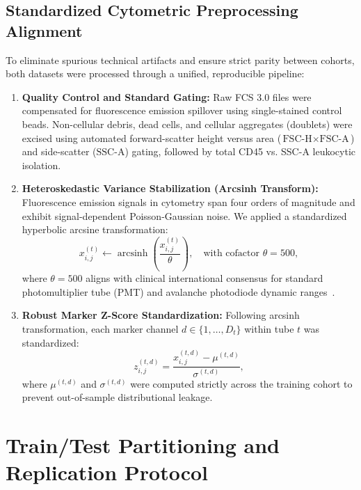 \documentclass[10pt,journal,compsoc]{IEEEtran}
\begin{document}
\subsection{Standardized Cytometric Preprocessing Alignment}
To eliminate spurious technical artifacts and ensure strict parity between cohorts, both datasets were processed through a unified, reproducible pipeline:
\begin{enumerate}
    \item \textbf{Quality Control and Standard Gating:} Raw FCS 3.0 files were compensated for fluorescence emission spillover using single-stained control beads. Non-cellular debris, dead cells, and cellular aggregates (doublets) were excised using automated forward-scatter height versus area ($\text{FSC-H} \times \text{FSC-A}$) and side-scatter ($\text{SSC-A}$) gating, followed by total CD45 vs. SSC-A leukocytic isolation.
    \item \textbf{Heteroskedastic Variance Stabilization (Arcsinh Transform):} Fluorescence emission signals in cytometry span four orders of magnitude and exhibit signal-dependent Poisson-Gaussian noise. We applied a standardized hyperbolic arcsine transformation:
    \begin{equation}
        x_{i,j}^{(t)} \leftarrow \operatorname{arcsinh}\left( \frac{x_{i,j}^{(t)}}{\theta} \right), \quad \text{with cofactor } \theta = 500,
    \end{equation}
    where $\theta = 500$ aligns with clinical international consensus for standard photomultiplier tube (PMT) and avalanche photodiode dynamic ranges~\cite{spitzer2016mass}.
    \item \textbf{Robust Marker Z-Score Standardization:} Following arcsinh transformation, each marker channel $d \in \{1, \dots, D_t\}$ within tube $t$ was standardized:
    \begin{equation}
        z_{i,j}^{(t,d)} = \frac{x_{i,j}^{(t,d)} - \mu^{(t,d)}}{\sigma^{(t,d)}},
    \end{equation}
    where $\mu^{(t,d)}$ and $\sigma^{(t,d)}$ were computed strictly across the training cohort to prevent out-of-sample distributional leakage.
\end{enumerate}

\section{Train/Test Partitioning and Replication Protocol}
\end{document}
